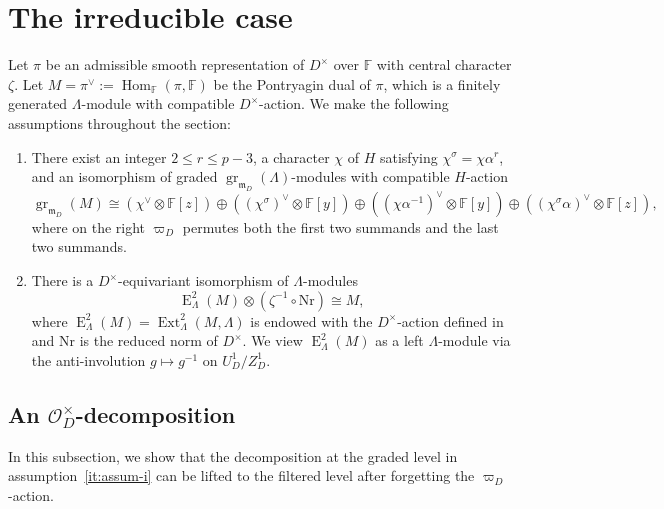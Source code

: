 \documentclass[11pt,a4paper]{article} %
\def\FF{\mathbb{F}}
\def\cO{\mathcal{O}}
\def\E{\operatorname{E}}
\def\Ext{\operatorname{Ext}} %
\def\gr{\operatorname{gr}}
\def\Hom{\operatorname{Hom}}
\begin{document}
\section{The irreducible case}

Let $\pi$ be an admissible smooth representation of $D^{\times}$ over $\FF$ with central character $\zeta$. Let $M=\pi^{\vee}:=\Hom_{\FF}(\pi,\FF)$ be the Pontryagin dual of $\pi$, which is a finitely generated $\Lambda$-module with compatible $D^{\times}$-action. We make the following assumptions throughout the section:
\begin{enumerate}
\item\label{it:assum-i} There exist an integer $2\le r\le p-3$, a character $\chi$ of $H$ satisfying $\chi^\sigma=\chi\alpha^r$, and an isomorphism of graded $\gr_{\mathfrak{m}_D}(\Lambda)$-modules with compatible $H$-action 
\begin{equation}\label{eq:irr-gr}
\gr_{\mathfrak{m}_D}(M)\cong(\chi^\vee\otimes\FF[z])\oplus\left((\chi^\sigma)^\vee\otimes\FF[y]\right)\oplus\left((\chi\alpha^{-1})^\vee\otimes\FF[y]\right)\oplus\left((\chi^\sigma\alpha)^\vee\otimes\FF[z]\right),
\end{equation}
where on the right $\varpi_D$ permutes both the first two summands and the last two summands.
\item\label{it:assum-ii} There is a $D^{\times}$-equivariant isomorphism of $\Lambda$-modules
\begin{equation}\label{eq:self-duality}
\E^2_\Lambda(M)\otimes(\zeta^{-1}\circ\mathrm{Nr})\cong M,
\end{equation}
where $\E^2_\Lambda(M)=\Ext^2_\Lambda(M,\Lambda)$ is endowed with the $D^{\times}$-action defined in \cite[Proposition 3.2]{Koh17} and $\mathrm{Nr}$ is the reduced norm of $D^{\times}$. We view $\E^2_\Lambda(M)$ as a left $\Lambda$-module via the anti-involution $g\mapsto g^{-1}$ on $U_D^1/Z_D^1$.
\end{enumerate}

\subsection{An \texorpdfstring{$\cO_D^{\times}$}{O\textasciicircum{}x}-decomposition}

In this subsection, we show that the decomposition at the graded level in assumption~\ref{it:assum-i} can be lifted to the filtered level after forgetting the $\varpi_D$-action.
\end{document}
